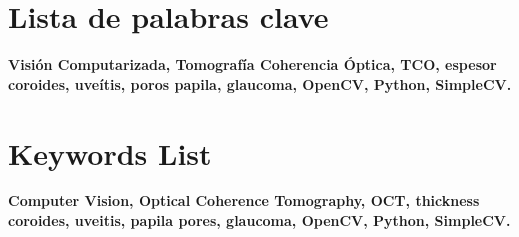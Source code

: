 \chapter{Lista de palabras clave}
\textbf{Visión Computarizada, Tomografía Coherencia Óptica, TCO,
  espesor coroides, uveítis, poros papila, glaucoma, OpenCV, Python,
  SimpleCV.}

\chapter{Keywords List}
\textbf{Computer Vision, Optical Coherence Tomography, OCT, thickness
  coroides, uveitis, papila pores, glaucoma, OpenCV, Python,
  SimpleCV.}
